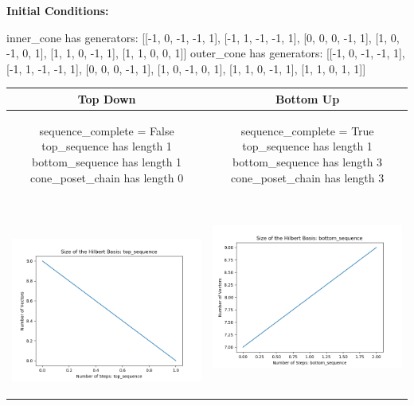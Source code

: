 \documentclass[10pt]{article}
\begin{document}
\textbf{Initial Conditions:}
\begin{SAGE}
inner_cone has generators: 
[[-1, 0, -1, -1, 1], [-1, 1, -1, -1, 1], [0, 0, 0, -1, 1], [1, 0, -1, 0, 1], [1, 1, 0, -1, 1], [1, 1, 0, 0, 1]]
outer_cone has generators: 
[[-1, 0, -1, -1, 1], [-1, 1, -1, -1, 1], [0, 0, 0, -1, 1], [1, 0, -1, 0, 1], [1, 1, 0, -1, 1], [1, 1, 0, 1, 1]]

\end{SAGE}
\begin{tabular}{c|c}
\textbf{Top Down} & \textbf{Bottom Up} \\ \hline  
\begin{SAGE}
	sequence_complete = False
	top_sequence has length 1
	bottom_sequence has length 1
	cone_poset_chain has length 0
\end{SAGE} 
&
\begin{SAGE}
	sequence_complete = True
	top_sequence has length 1
	bottom_sequence has length 3
	cone_poset_chain has length 3
\end{SAGE} 
\\ \hline
\
\begin{minipage}{.45\textwidth}
\includegraphics[width=\textwidth]{"DATA/5d/6 generators 1 bound A/top_sequence SIZE"}
\end{minipage} &
\begin{minipage}{.45\textwidth}
\includegraphics[width=\textwidth]{"DATA/5d/6 generators 1 bound A bottomup/bottom_sequence SIZE"}

\end{minipage}
\end{tabular}
\end{document}
